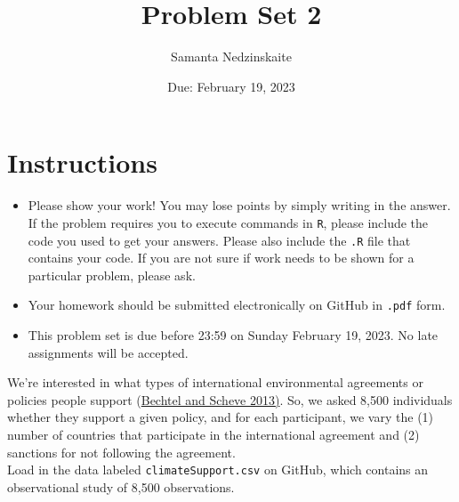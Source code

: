 \documentclass[12pt,letterpaper]{article}
\title{Problem Set 2}
\date{Due: February 19, 2023}
\author{Samanta Nedzinskaite}
\begin{document}
	\maketitle
	\section*{Instructions}
	\begin{itemize}
		\item Please show your work! You may lose points by simply writing in the answer. If the problem requires you to execute commands in \texttt{R}, please include the code you used to get your answers. Please also include the \texttt{.R} file that contains your code. If you are not sure if work needs to be shown for a particular problem, please ask.
		\item Your homework should be submitted electronically on GitHub in \texttt{.pdf} form.
		\item This problem set is due before 23:59 on Sunday February 19, 2023. No late assignments will be accepted.
	\end{itemize}

	
	

	\vspace{.25cm}
\noindent We're interested in what types of international environmental agreements or policies people support (\href{https://www.pnas.org/content/110/34/13763}{Bechtel and Scheve 2013)}. So, we asked 8,500 individuals whether they support a given policy, and for each participant, we vary the (1) number of countries that participate in the international agreement and (2) sanctions for not following the agreement. \\

\noindent Load in the data labeled \texttt{climateSupport.csv} on GitHub, which contains an observational study of 8,500 observations.
\end{document}
